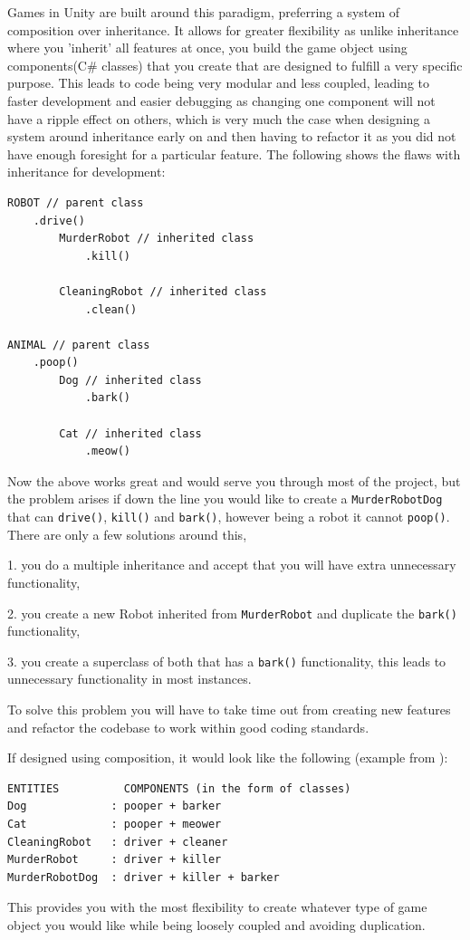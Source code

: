\documentclass[11pt]{report}
\begin{document}
Games in Unity are built around this paradigm, preferring a system of composition over inheritance. It allows for greater flexibility as unlike inheritance where you 'inherit' all features at once, you build the game object using components(C\# classes) that you create that are designed to fulfill a very specific purpose. This leads to code being very modular and less coupled, leading to faster development and easier debugging as changing one component will not have a ripple effect on others, which is very much the case when designing a system around inheritance early on and then having to refactor it as you did not have enough foresight for a particular feature.
The following shows the flaws with inheritance for development\cite{CompOverInherit}:
\begin{lstlisting}
ROBOT // parent class
    .drive()
        MurderRobot // inherited class
            .kill()
        
        CleaningRobot // inherited class
            .clean()

ANIMAL // parent class
    .poop()
        Dog // inherited class
            .bark()

        Cat // inherited class
            .meow()
\end{lstlisting}
Now the above works great and would serve you through most of the project, but the problem arises if down the line you would like to create a \lstinline{MurderRobotDog} that can \lstinline{drive()}, \lstinline{kill()} and \lstinline{bark()}, however being a robot it cannot  \lstinline{poop()}. There are only a few solutions around this, 

1. you do a multiple inheritance and accept that you will have extra unnecessary functionality, 

2. you create a new Robot inherited from  \lstinline{MurderRobot} and duplicate the  \lstinline{bark()} functionality, 

3. you create a superclass of both that has a  \lstinline{bark()} functionality, this leads to unnecessary functionality in most instances. 

To solve this problem you will have to take time out from creating new features and refactor the codebase to work within good coding standards\cite{codingPractices}.

If designed using composition, it would look like the following (example from \cite{CompOverInherit}):
\begin{lstlisting}[frame=single]
ENTITIES          COMPONENTS (in the form of classes)
Dog             : pooper + barker
Cat             : pooper + meower
CleaningRobot   : driver + cleaner
MurderRobot     : driver + killer
MurderRobotDog  : driver + killer + barker
\end{lstlisting}
This provides you with the most flexibility to create whatever type of game object you would like while being loosely coupled and avoiding duplication.
\end{document}
